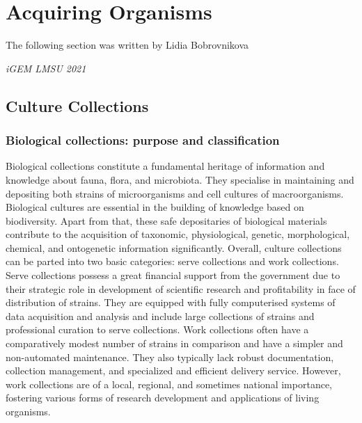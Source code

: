 
\section{Acquiring Organisms}
\epigraph{The following section was written by Lidia Bobrovnikova}{\textit{iGEM LMSU 2021}}
\subsection{Culture Collections}
\subsubsection{Biological collections: purpose and classification}
Biological collections constitute a fundamental heritage of information and knowledge about fauna, flora, and microbiota. They specialise in maintaining and depositing both strains of microorganisms and cell cultures of macroorganisms. Biological cultures are essential in the building of knowledge based on biodiversity. Apart from that, these safe depositaries of biological materials contribute to the acquisition of taxonomic, physiological, genetic, morphological, chemical, and ontogenetic information significantly. 
\newline\newline
Overall, culture collections can be parted into two basic categories: serve collections and work collections. Serve collections possess a great financial support from the government due to their strategic role in development of scientific research and profitability in face of distribution of strains. They are equipped with fully computerised systems of data acquisition and analysis and include large collections of strains and professional curation to serve collections. Work collections often have a comparatively modest number of strains in comparison and have a simpler and non-automated maintenance. They also typically lack robust documentation, collection management, and specialized and efficient delivery service. However, work collections are of a local, regional, and sometimes national importance, fostering various forms of research development and applications of living organisms.
\newline\newline

